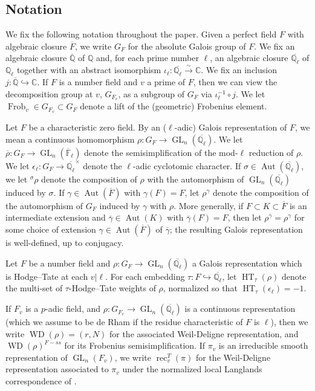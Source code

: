 \documentclass{amsart}
\theoremstyle{definition}
\numberwithin{equation}{section} %
\newcommand{\GL}{\operatorname{GL}}
\newcommand{\Aut}{\operatorname{Aut}}
\newcommand{\WD}{\operatorname{WD}}
\newcommand{\rec}{\operatorname{rec}}
\newcommand{\Qlbar}{\ensuremath{\overline{\mathbb{Q}_\ell}}}
\newcommand{\Frob}{\operatorname{Frob}}
\newcommand{\HT}{\operatorname{HT}}
\newcommand{\bb}[1]{\mathbb{#1}}
\newcommand{\ol}[1]{\overline{#1}}
\begin{document}
\subsection{Notation}

We fix the following notation throughout the paper.
Given a perfect field $F$ with algebraic closure $\ol{F}$, we write $G_F$ for the absolute Galois group of $F$.
We fix an algebraic closure $\ol{\bb{Q}}$ of $\bb{Q}$ and, for each prime number $\ell$, an algebraic closure $\Qlbar$ of $\bb{Q}_\ell$ together with an abstract isomorphism $\iota_\ell: \Qlbar \xrightarrow{\sim} \bb{C}$.
We fix an inclusion $j: \ol{\bb{Q}} \hookrightarrow \bb{C}$.
If $F$ is a number field and $v$ a prime of $F$, then we can view the decomposition group at $v$, $G_{F_v}$, as a subgroup of $G_F$ via $\iota_\ell^{-1} \circ j$.
We let $\Frob_v \in G_{F_v} \subset G_F$ denote a lift of the (geometric) Frobenius element.

Let $F$ be a characteristic zero field.
By an ($\ell$-adic) Galois representation of $F$, we mean a continuous homomorphism $\rho: G_F \to \GL_n(\Qlbar)$.
We let $\overline{\rho}: G_F \to \GL_n(\ol{\mathbb{F}}_\ell)$ denote the semisimplification of the mod-$\ell$ reduction of $\rho$.
We let $\epsilon_\ell: G_F \to \Qlbar^\times$ denote the $\ell$-adic cyclotomic character.
If $\sigma \in \Aut(\Qlbar)$, we let ${}^\sigma \rho$ denote the composition of $\rho$ with the automorphism of $\GL_n(\Qlbar)$ induced by $\sigma$.
If $\gamma \in \Aut(\ol{F})$ with $\gamma(F) = F$, let $\rho^\gamma$ denote the composition of the automorphism of $G_F$ induced by $\gamma$ with $\rho$.
More generally, if $F \subset K \subset \ol{F}$ is an intermediate extension and $\ol{\gamma} \in \Aut(K)$ with $\ol{\gamma}(F) = F$, then let $\rho^{\ol{\gamma}} = \rho^{\gamma}$ for some choice of extension $\gamma \in \Aut(\ol{F})$ of $\ol{\gamma}$; the resulting Galois representation is well-defined, up to conjugacy.

Let $F$ be a number field and $\rho: G_F \to \GL_n(\Qlbar)$ a Galois representation which is Hodge--Tate at each $v|\ell$.
For each embedding $\tau: F \hookrightarrow \Qlbar$, let $\HT_\tau(\rho)$ denote the multi-set of $\tau$-Hodge--Tate weights of $\rho$, normalized so that $\HT_\tau(\epsilon_\ell) = -1$.

If \( F_v \) is a \( p \)-adic field, and \( \rho:G_{F_v}\to\GL_n(\Qlbar) \) is a continuous representation (which we assume to be de Rham if the residue characteristic of \( F \) is \(\ell\)), then we write \( \WD(\rho)=(r,N) \) for the associated Weil-Deligne representation, and \( \WD(\rho)^{F-ss} \) for its Frobenius semisimplification. If \( \pi_v \) is an irreducible smooth representation of $\GL_n(F_v)$, we write $\rec_v^T(\pi)$ for the Weil-Deligne representation associated to \( \pi_v \) under the normalized local Langlands correspondence of \cite{harristaylorLLC}.
\end{document}
